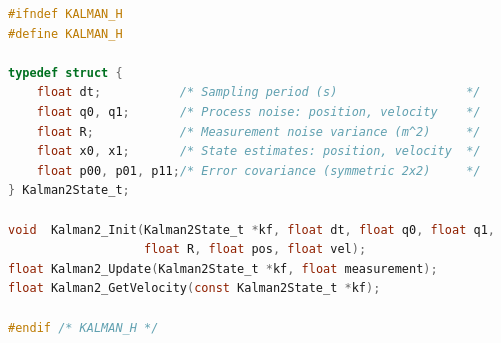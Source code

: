 \begin{lstlisting}[language=C,
    caption={\texttt{kalman.h} --- 2-State Discrete Kalman Filter Public Interface},
    label={lst:kalmanh_exp5}]
#ifndef KALMAN_H
#define KALMAN_H

typedef struct {
    float dt;           /* Sampling period (s)                  */
    float q0, q1;       /* Process noise: position, velocity    */
    float R;            /* Measurement noise variance (m^2)     */
    float x0, x1;       /* State estimates: position, velocity  */
    float p00, p01, p11;/* Error covariance (symmetric 2x2)     */
} Kalman2State_t;

void  Kalman2_Init(Kalman2State_t *kf, float dt, float q0, float q1,
                   float R, float pos, float vel);
float Kalman2_Update(Kalman2State_t *kf, float measurement);
float Kalman2_GetVelocity(const Kalman2State_t *kf);

#endif /* KALMAN_H */
\end{lstlisting}


